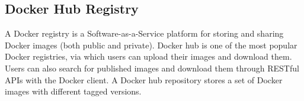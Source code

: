 









\subsection{Docker Hub Registry}

A Docker registry is a Software-as-a-Service platform for storing and sharing Docker
images (both public and private). Docker hub is one of the most popular Docker
registries, via which users can upload their images and download them. Users can
also search for published images and download them through RESTful APIs with the
Docker client.
%
%
A Docker hub repository stores a set of Docker images with different tagged versions.
%


